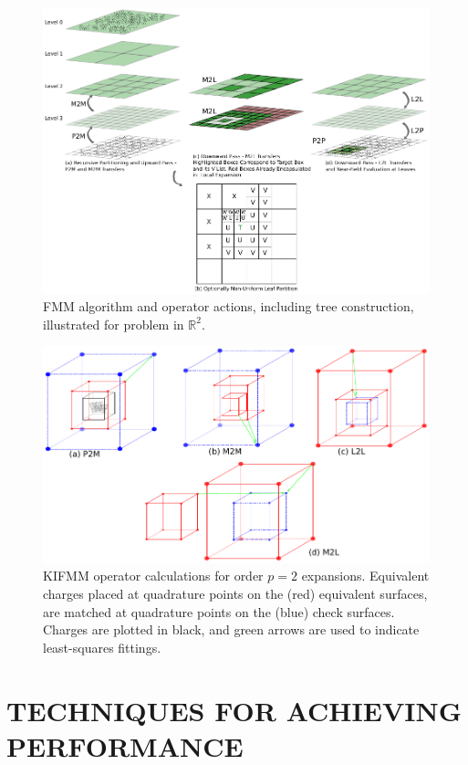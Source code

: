 \documentclass{IEEEcsmag}
\begin{document}
\begin{figure}
	\centerline{\includegraphics {figures/tree.pdf}}
	\caption{FMM algorithm and operator actions, including tree construction, illustrated for problem in $\mathbb{R}^2$.}
	\label{fig:algorithm}
\end{figure}

\begin{figure}
	\centerline{\includegraphics {figures/operators.pdf}}
	\caption{KIFMM operator calculations for order $p=2$ expansions. Equivalent charges placed at quadrature points on the (red) equivalent surfaces, are matched at quadrature points on the (blue) check surfaces. Charges are plotted in black, and green arrows are used to indicate least-squares fittings.}
	\label{fig:operators}
\end{figure}


\section{TECHNIQUES FOR ACHIEVING PERFORMANCE}
\end{document}
